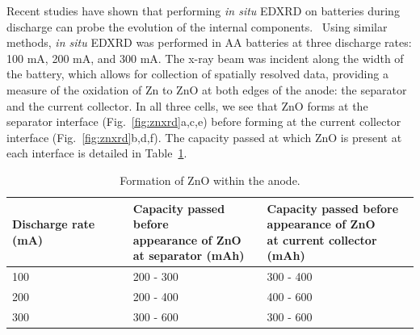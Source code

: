 {Recent studies have shown that performing \textit{in situ} EDXRD on batteries during discharge can probe the evolution of the internal components.~\cite{gallaway,haibel,manke} Using similar methods, \textit{in situ} EDXRD was performed in AA batteries at three discharge rates: 100 mA, 200 mA, and 300 mA. The x-ray beam was incident along the width of the battery, which allows for collection of spatially resolved data, providing a measure of the oxidation of Zn to ZnO at both edges of the anode: the separator and the current collector. In all three cells, we see that ZnO forms at the separator interface (Fig.~\ref{fig:znxrd}a,c,e) before forming at the current collector interface (Fig.~\ref{fig:znxrd}b,d,f). The capacity passed at which ZnO is present at each interface is detailed in Table~\ref{tab:znotable}.

\begin{table}[htb]
\centering
  \caption{\label{tab:znotable}Formation of ZnO within the anode.}
  \begin{tabular}{*{3}{l}}
    \hline
       Discharge rate (mA)&\specialcell{Capacity passed before\\appearance of ZnO\\at separator (mAh)}&\specialcell{Capacity passed before\\appearance of ZnO\\at current collector (mAh)}\\
    \hline
        100 & 200 - 300 & 300 - 400\\
        200 & 200 - 400 & 400 - 600\\
        300 & 300 - 600 & 300 - 600\\
  \end{tabular}
\end{table}


}
